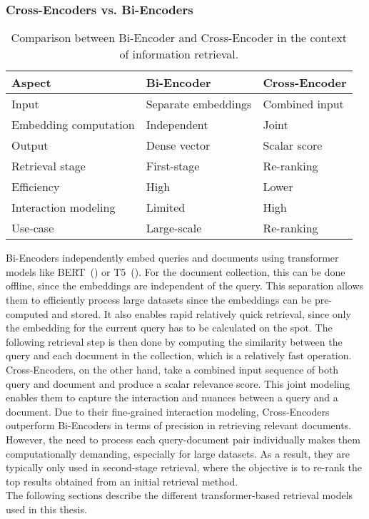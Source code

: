 \subsubsection{Cross-Encoders vs. Bi-Encoders}\label{sec:cross-encoders}
\begin{table}[h]
    \centering
    
    \begin{tabularx}{\textwidth}{l>{\centering\arraybackslash}X>{\centering\arraybackslash}X} %
        \toprule
        \textbf{Aspect} & \textbf{Bi-Encoder} & \textbf{Cross-Encoder} \\
        \midrule
        Input & Separate embeddings & Combined input \\
        \addlinespace
        Embedding computation & Independent & Joint \\
        \addlinespace
        Output & Dense vector & Scalar score \\
        \addlinespace
        Retrieval stage & First-stage & Re-ranking \\
        \addlinespace
        Efficiency & High & Lower \\
        \addlinespace
        Interaction modeling & Limited & High \\
        \addlinespace
        Use-case & Large-scale & Re-ranking \\
        \bottomrule
    \end{tabularx}
    \caption{Comparison between Bi-Encoder and Cross-Encoder in the context of information retrieval.}
    \label{tab:encoder_comparison}
\end{table}

Bi-Encoders independently embed queries and documents using transformer models like BERT~(\cite{devlin:2018}) or T5~(\cite{roberts:2019}).
For the document collection, this can be done offline, since the embeddings are independent of the query.
This separation allows them to efficiently process large datasets since the embeddings can be pre-computed and stored.
It also enables rapid relatively quick retrieval, since only the embedding for the current query has to be calculated on the spot.
The following retrieval step is then done by computing the similarity between the query and each document in the collection, which is a relatively fast operation.
\\
Cross-Encoders, on the other hand, take a combined input sequence of both query and document and produce a scalar relevance score.
This joint modeling enables them to capture the interaction and nuances between a query and a document.
Due to their fine-grained interaction modeling, Cross-Encoders outperform Bi-Encoders in terms of precision in retrieving relevant documents.
However, the need to process each query-document pair individually makes them computationally demanding, especially for large datasets.
As a result, they are typically only used in second-stage retrieval, where the objective is to re-rank the top results obtained from an initial retrieval method.
\\
The following sections describe the different transformer-based retrieval models used in this thesis.
